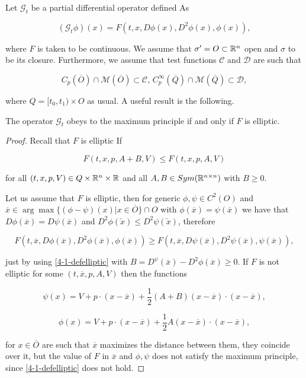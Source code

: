 Let $\mathcal{G}_t$ be a partial differential operator defined As

\begin{equation}\label{4-1-GPDEop}
    (\mathcal{G}_t\phi)(x) = F(t,x,D\phi(x), D^2\phi(x), \phi(x)),
\end{equation}

where $F$ is taken to be continuous. We assume that $\sigma'=O\subset\mathbb{R}^n$ open and $\sigma$ to be its closure. 
Furthermore, we assume that test functions $\mathcal{C}$ and $\mathcal{D}$ are such that

\begin{equation}\label{4-1-condonCandD}
    C_p(\overline{O})\cap\mathcal{M}(\overline{O}) \subset \mathcal{C},\,C_p^{\infty}(\overline{Q})\cap\mathcal{M}(\overline{Q}) \subset \mathcal{D},
\end{equation}

where $Q=[t_0,t_1)\times O$ as usual. A useful result is the following.

\begin{lemma}
    The operator $\mathcal{G}_t$ obeys to the maximum principle if and only if $F$ is elliptic.

    \begin{proof}
        Recall that $F$ is elliptic If

        \begin{equation}\label{4-1-defelliptic}
            F(t,x,p,A+B,V) \leq F(t,x,p,A,V)
        \end{equation}

        for all $(t,x,p,V)\in Q\times\mathbb{R}^n\times\mathbb{R}$ and all $A,B\in Sym(\mathbb{R}^{n\times n})$ with $B\geq0$.

        Let us assume that $F$ is elliptic, then for generic $\phi,\psi\in C^2(O)$ and $\overline{x}\in\arg \max\{(\phi-\psi)(x)|x\in\overline{O}\}\cap O$ 
        with $\phi(\overline{x})=\psi(\overline{x})$ we have that $D\phi(\overline{x})=D\psi(\overline{x})$ and $D^2\phi(\overleftarrow{x})\leq D^2\psi(\overleftarrow{x})$, 
        therefore

        \[F(t,\overline{x}, D\phi(\overline{x}), D^2\phi(\overline{x}),\phi(\overline{x}))\geq F(t,\overline{x}, D\psi(\overline{x}), D^2\psi(\overline{x}),\psi(\overline{x})),\]

        just by using \ref{4-1-defelliptic} with $B=D^\psi(\overline{x})-D^2\phi(\overline{x})\geq0$. If $F$ is not elliptic 
        for some $(t,\overline{x},p,A,V)$ then the functions

        \[\psi(x) = V+p\cdot(x-\overline{x}) + \frac{1}{2}(A+B)(x-\overline{x})\cdot(x-\overline{x}),\]

        \[\phi(x) = V+p\cdot(x-\overline{x}) + \frac{1}{2}A(x-\overline{x})\cdot(x-\overline{x}),\]

        for $x\in\overline{O}$ are such that $\overline{x}$ maximizes the distance between them, they coincide over it, but 
        the value of $F$ in $\overline{x}$ and $\phi,\psi$ does not satisfy the maximum principle, since \ref{4-1-defelliptic} 
        does not hold.
    \end{proof}
\end{lemma}

